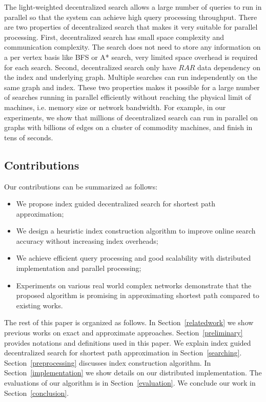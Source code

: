 The light-weighted decentralized search allows a large number of queries to run in parallel so that the system can achieve high query processing throughput. There are two properties of decentralized search that makes it very suitable for parallel processing. First, decentralized search has small space complexity and communication complexity. The search does not need to store any information on a per vertex basis like BFS or A* search, very limited space overhead is required for each search. Second, decentralized search only have $RAR$ data dependency on the index and underlying graph. Multiple searches can run independently on the same graph and index. These two properties makes it possible for a large number of searches running in parallel efficiently without reaching the physical limit of machines, i.e. memory size or network bandwidth. For example, in our experiments, we show that millions of decentralized search can run in parallel on graphs with billions of edges on a cluster of commodity machines, and finish in tens of seconds. 

\subsection{Contributions}
Our contributions can be summarized as follows:

\begin{itemize}
	\item We propose index guided decentralized search for shortest path approximation;
	\item We design a heuristic index construction algorithm to improve online search accuracy without increasing index overheads;
	\item We achieve efficient query processing and good scalability with distributed implementation and parallel processing;
	\item Experiments on various real world complex networks demonstrate that the proposed algorithm is promising in approximating shortest path compared to existing works.
\end{itemize}

The rest of this paper is organized as follows. In Section~\ref{relatedwork} we show previous works on exact and approximate approaches. Section~\ref{preliminary} provides notations and definitions used in this paper. We explain index guided decentralized search for shortest path approximation in Section~\ref{searching}. Section~\ref{preprocessing} discusses index construction algorithm. In Section~\ref{implementation} we show details on our distributed implementation. The evaluations of our algorithm is in Section~\ref{evaluation}. We conclude our work in Section~\ref{conclusion}.
